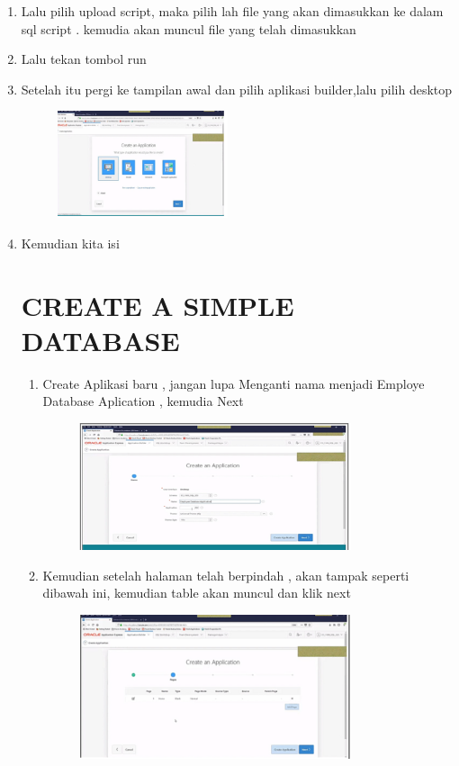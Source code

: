 \documentclass{article}
\begin{document}
\begin{enumerate}
\begin{enumerate}
\begin{enumerate}
\begin{figure}[h]
            \end{figure}
    \item Lalu pilih upload script, maka pilih lah file yang akan dimasukkan ke dalam sql script . kemudia akan muncul file yang telah dimasukkan
    \item Lalu tekan tombol run
    \item Setelah itu pergi ke tampilan awal dan pilih aplikasi builder,lalu pilih desktop
    \begin{figure}[h]
            \centerline{\includegraphics[width=5cm]{image/f.PNG}}
            \end{figure}
    \newpage \item Kemudian kita isi
\newpage \section{CREATE A SIMPLE DATABASE}
\begin{enumerate}
    \item Create Aplikasi baru , jangan lupa Menganti nama menjadi Employe Database Aplication , kemudia Next
    \begin{figure}[h]
          \newpage  \centerline{\includegraphics[width=8cm]{image/g.PNG}}
            \end{figure}
    \item Kemudian setelah halaman telah berpindah , akan tampak seperti dibawah ini, kemudian table akan muncul dan klik next
    \begin{figure}[h]
            \centerline{\includegraphics[width=8cm]{image/h.PNG}}

\end{figure}
\end{enumerate}
\end{enumerate}
\end{enumerate}
\end{enumerate}
\end{document}
